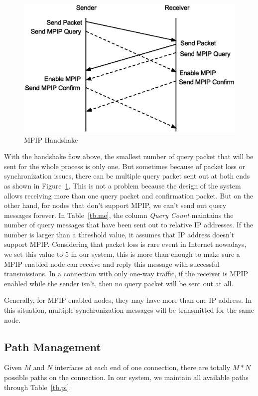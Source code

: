 \begin{figure}
\centering
\includegraphics[width=0.8\linewidth]{fig/handshake.eps}
\caption{MPIP Handshake}
\label{fig.handshake}
\end{figure}

With the handshake flow above, the smallest number of query packet that will be sent for the whole process is only one. But sometimes because of packet loss or synchronization issues, there can be multiple query packet sent out at both ends as shown in Figure~\ref{fig.handshake}. This is not a problem because the design of the system allows receiving more than one query packet and confirmation packet. But on the other hand, for nodes that don't support MPIP, we can't send out query messages forever. In Table~\ref{tb.me}, the column \emph{Query Count} maintains the number of query messages that have been sent out to relative IP addresses. If the number is larger than a threshold value, it assumes that IP address doesn't support MPIP. Considering that packet loss is rare event in Internet nowadays, we set this value to $5$ in our system, this is more than enough to make sure a MPIP enabled node can receive and reply this message with successful transmissions. In a connection with only one-way traffic, if the receiver is MPIP enabled while the sender isn't, then no query packet will be sent out at all.

Generally, for MPIP enabled nodes, they may have more than one IP address. In this situation, multiple synchronization messages will be transmitted for the same node.


\subsection{Path Management}
\label{sec:path}

Given $M$ and $N$ interfaces at each end of one connection, there are totally $M*N$ possible paths on the connection. In our system, we maintain all available paths through Table~\ref{tb.pi}.

